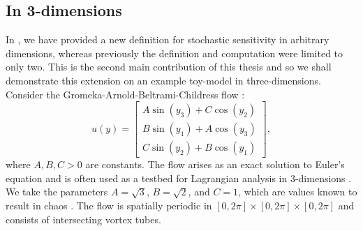 \subsection{In 3-dimensions}\label{sec:comput_s2_3d}
In , we have provided a new definition for stochastic sensitivity in arbitrary dimensions, whereas previously the definition and computation were limited to only two.
This is the second main contribution of this thesis and so we shall demonstrate this extension on an example toy-model in three-dimensions.
Consider the Gromeka-Arnold-Beltrami-Childress flow \citep{DombreEtAl_1986_ChaoticStreamlinesABC}:
\begin{equation}\label{eqn:gabc}
	u\!\left(y\right) = \begin{bmatrix}
		A\sin\!\left(y_3\right) + C\cos\!\left(y_2\right) \\
		B\sin\!\left(y_1\right) + A\cos\!\left(y_3\right) \\
		C\sin\!\left(y_2\right) + B\cos\!\left(y_1\right)
	\end{bmatrix},
\end{equation}
where \(A, B, C > 0\) are constants.
The flow arises as an exact solution to Euler's equation and is often used as a testbed for Lagrangian analysis in 3-dimensions \citep[e.g.]{NelsonJacobs_2016_HighorderVisualizationThreedimensional,BruntonRowley_2010_FastComputationFinitetime,Haller_2001_DistinguishedMaterialSurfaces,SulmanEtAl_2013_LeavingFlatlandDiagnostics}.
We take the parameters \(A = \sqrt{3}\), \(B = \sqrt{2}\), and \(C = 1\), which are values known to result in chaos \citep{DombreEtAl_1986_ChaoticStreamlinesABC}.
The flow is spatially periodic in \([0,2\pi] \times [0,2\pi] \times [0,2\pi]\) and consists of intersecting vortex tubes.

